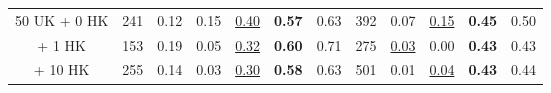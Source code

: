 \begin{table*}[!ht]
{\begin{tabular}{c|rccccc|rcccc}
\hspace{0.5ex} 50 UK  + \hspace{0.5ex} 0 HK   & 241                                              & 0.12                                                                       & 0.15                                                       & \underline{0.40}                                                                & \textbf{0.57}                                                              & 0.63                                                                           & 392                                              & 0.07                                                                        & \underline{0.15}                                                                & \textbf{0.45}                                                              & 0.50                                                                          \\
\hspace{7ex} + \hspace{0.5ex} 1 HK   & 153                                              & 0.19                                                                       & 0.05                                                                        & \underline{0.32}                                                                & \textbf{0.60}                                                              & 0.71                                                                           & 275                 & \underline{0.03}                                                                  & 0.00                                                                      & \textbf{0.43}                                                              & 0.43                                                                          \\
\hspace{7ex} + 10 HK  & 255                                              & 0.14                                                                       & 0.03                                    & \underline{0.30}                                                                & \textbf{0.58}                                                              & 0.63                                                                           & 501                                              & 0.01                                                                        & \underline{0.04}                                                                & \textbf{0.43}                                                              & 0.44                                                                          \\

\end{tabular}}
\end{table*}
